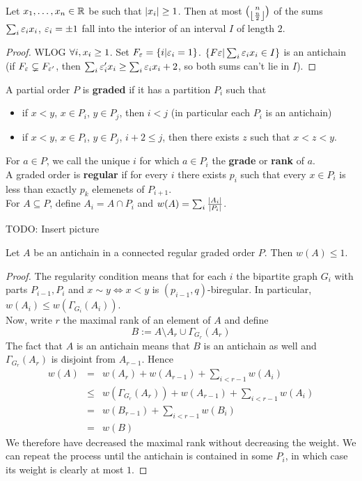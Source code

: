 \documentclass{article}
\begin{document}
\begin{ncor}
  Let $x_1, \dots, x_n \in \mathbb R$ be such that $\left\lvert x_i\right\rvert \ge 1$. Then at most $\binom n{\left\lfloor \frac n 2\right\rfloor}$ of the sums $\sum_i \varepsilon_i x_i$, $\varepsilon_i = \pm 1$ fall into the interior of an interval $I$ of length $2$.
\end{ncor}
\begin{proof}
  WLOG $\forall i, x_i \ge 1$. Set $F_\varepsilon = \{i | \varepsilon_i = 1\}$. $\{F\varepsilon | \sum_i \varepsilon_i x_i \in I\}$ is an antichain (if $F_\varepsilon \subsetneq F_{\varepsilon'}$, then $\sum_i \varepsilon'_i x_i \ge \sum_i \varepsilon_i x_i + 2$, so both sums can't lie in $I$).
\end{proof}

\begin{defi}
  A partial order $P$ is {\bf graded} if it has a partition $P_i$ such that
  \begin{itemize}
    \item if $x < y$, $x \in P_i$, $y \in P_j$, then $i < j$ (in particular each $P_i$ is an antichain)
    \item if $x < y$, $x \in P_i$, $y \in P_j$, $i + 2 \le j$, then there exists $z$ such that $x < z < y$.
  \end{itemize}
  For $a \in P$, we call the unique $i$ for which $a \in P_i$ the {\bf grade} or {\bf rank} of $a$. \\
  A graded order is {\bf regular} if for every $i$ there exists $p_i$ such that every $x \in P_i$ is less than exactly $p_k$ elemenets of $P_{i + 1}$. \\
  For $A \subseteq P$, define $A_i = A \cap P_i$ and $w(A) = \sum_i \frac{\left\lvert A_i\right\rvert}{\left\lvert P_i\right\rvert}$.
\end{defi}

TODO: Insert picture

\begin{nthm}
  Let $A$ be an antichain in a connected regular graded order $P$. Then $w(A) \le 1$.
\end{nthm}
\begin{proof}
  The regularity condition means that for each $i$ the bipartite graph $G_i$ with parts $P_{i - 1}, P_i$ and $x \sim y \iff x < y$ is $(p_{i - 1}, q)$-biregular. In particular, $w(A_i) \le w(\Gamma_{G_i}(A_i))$. \\
  Now, write $r$ the maximal rank of an element of $A$ and define
  $$B := A \setminus A_r \cup \Gamma_{G_r}(A_r)$$
  The fact that $A$ is an antichain means that $B$ is an antichain as well and $\Gamma_{G_r}(A_r)$ is disjoint from $A_{r - 1}$. Hence
  \begin{eqnarray*}
    w(A)
    & = & w(A_r) + w(A_{r - 1}) + \sum_{i < r - 1} w(A_i) \\
    & \le & w(\Gamma_{G_r}(A_r)) + w(A_{r - 1}) + \sum_{i < r - 1} w(A_i) \\
    & = & w(B_{r - 1}) + \sum_{i < r - 1} w(B_i) \\
    & = & w(B)
  \end{eqnarray*}
  We therefore have decreased the maximal rank without decreasing the weight. We can repeat the process until the antichain is contained in some $P_i$, in which case its weight is clearly at most $1$.
\end{proof}
\end{document}
